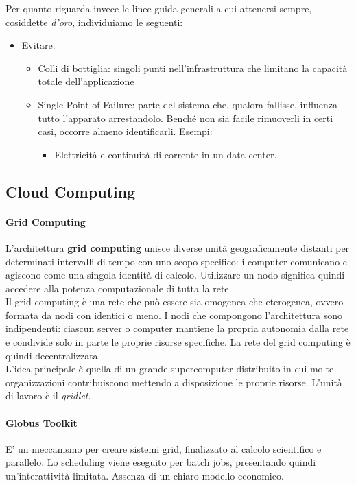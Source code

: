 \documentclass{article}
\begin{document}
		Per quanto riguarda invece le linee guida generali a cui attenersi sempre, cosiddette \textit{d'oro}, individuiamo le seguenti:
		\begin{itemize}
		    \item Evitare:
		    \begin{itemize}
		        \item Colli di bottiglia: singoli punti nell'infrastruttura che limitano la capacità totale dell'applicazione
		        \item Single Point of Failure: parte del sistema che, qualora fallisse, influenza tutto l'apparato arrestandolo. Benché non sia facile rimuoverli in certi casi, occorre almeno identificarli.
		        Esempi:
		        \begin{itemize}
		            \item Elettricità e continuità di corrente in un data center.
		        \end{itemize}
		    \end{itemize}
		\end{itemize}
		
		\subsection{Cloud Computing}
		\paragraph{Grid Computing}
		L’architettura \textbf{grid computing} unisce diverse unità geograficamente distanti per determinati intervalli di tempo con uno scopo specifico: i computer comunicano e agiscono come una singola identità di calcolo. Utilizzare un nodo significa quindi accedere alla potenza computazionale di tutta la rete.\\
		
		Il grid computing è una rete che può essere sia omogenea che eterogenea, ovvero formata da nodi con identici o meno. I nodi che compongono l’architettura sono indipendenti: ciascun server o computer mantiene la propria autonomia dalla rete e condivide solo in parte le proprie risorse specifiche. La rete del grid computing è quindi decentralizzata.\\
		
		L'idea principale è quella di un grande supercomputer distribuito in cui molte organizzazioni contribuiscono mettendo a disposizione le proprie risorse. L'unità di lavoro è il \emph{gridlet}.
		
		\paragraph{Globus Toolkit}
		E' un meccanismo per creare sistemi grid, finalizzato al calcolo scientifico e parallelo. Lo scheduling viene eseguito per batch jobs, presentando quindi un'interattività limitata. Assenza di un chiaro modello economico.
		
\end{document}
